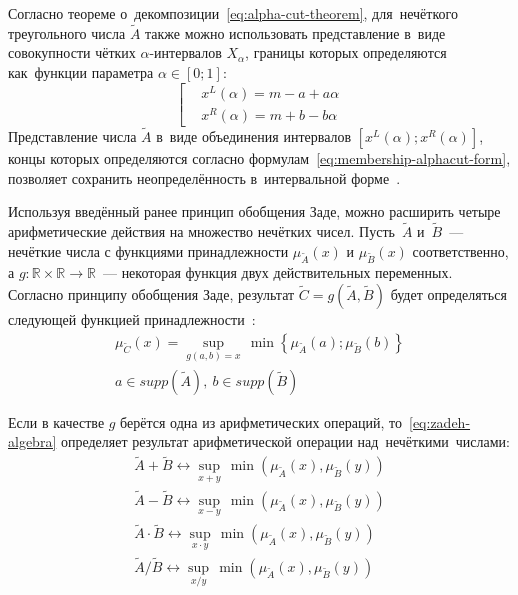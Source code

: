 Согласно теореме о~декомпозиции~\eqref{eq:alpha-cut-theorem}, для~нечёткого треугольного числа $\tilde{A}$ также можно использовать представление в~виде совокупности чётких $\alpha$-интервалов $X_\alpha$, границы которых определяются как~функции параметра $\alpha \in \left[ 0;1 \right]$:
\begin{equation}
\label{eq:membership-alphacut-form}
	\left[ 
		\begin{aligned}
			& x^L(\alpha )=m-a+a\alpha  \\ 
			& x^R(\alpha )=m+b-b\alpha
		 \end{aligned}
	\right.
\end{equation}
Представление числа $\tilde{A}$ в~виде объединения интервалов $\left[ {{x}^{L}}\left( \alpha  \right);{{x}^{R}}\left( \alpha  \right) \right]$, концы которых определяются согласно формулам~\eqref{eq:membership-alphacut-form}, позволяет сохранить неопределённость в~интервальной форме~\cite{Hanss_Engineering}.

Используя введённый ранее принцип обобщения Заде, можно расширить четыре арифметические действия на множество нечётких чисел. Пусть~$\tilde{A}$ и~$\tilde{B}$~--- нечёткие числа с функциями принадлежности $\mu_{\tilde A}\left( x \right)$ и $\mu_{\tilde B}\left( x \right)$ соответственно, а $g:\mathbb{R}\times \mathbb{R}\to \mathbb{R}$~--- некоторая функция двух действительных переменных. Согласно принципу обобщения Заде, результат $\tilde{C}=g\left( \tilde{A},\tilde{B} \right)$ будет определяться следующей функцией принадлежности~\cite{Borisov_Alexeev_Msk, Pospelov, Borisov_Fedulov_Arithmetics, Yakhyaeva}:
\begin{equation}
\label{eq:zadeh-algebra}
	\begin{matrix}
		\mu_{\tilde C}\left( x \right)=\underset{g\left( a,b \right)=x}{\mathop{\sup }}{}\,\min \left\{ {{\mu }_{{\tilde{A}}}}\left( a \right);{{\mu }_{{\tilde{B}}}}\left( b \right) \right\} \\ 
		  a\in supp\left( {\tilde{A}} \right),\ b\in supp\left( {\tilde{B}} \right) 
	\end{matrix}
\end{equation}

Если в качестве $g$ берётся одна из арифметических операций, то~\eqref{eq:zadeh-algebra} определяет результат арифметической операции над~нечёткими~числами:
\begin{gather*}
		\tilde{A}+\tilde{B} \leftrightarrow \underset{x+y}{\mathop{\sup }}\,\min \left( {{\mu }_{{\tilde{A}}}}\left( x \right),{{\mu }_{{\tilde{B}}}}\left( y \right) \right) \\
		\tilde{A}-\tilde{B} \leftrightarrow \underset{x-y}{\mathop{\sup }}\,\min \left( {{\mu }_{{\tilde{A}}}}\left( x \right),{{\mu }_{{\tilde{B}}}}\left( y \right) \right) \\
		\tilde{A}\cdot \tilde{B} \leftrightarrow \underset{x\cdot y}{\mathop{\sup }}\,\min \left( {{\mu }_{{\tilde{A}}}}\left( x \right),{{\mu }_{{\tilde{B}}}}\left( y \right) \right) \\
		\tilde{A}/\tilde{B} \leftrightarrow \underset{x/y}{\mathop{\sup }}\,\min \left( \mu_{\tilde A}\left( x \right), \mu_{\tilde B} \left( y \right) \right) 
\end{gather*}

